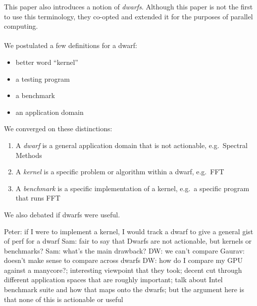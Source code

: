 This paper also introduces a notion of \textit{dwarfs}.
Although this paper is not the first to use this terminology, they co-opted and extended it for the purposes of parallel computing.
\\ \\
We postulated a few definitions for a dwarf:
\begin{itemize}
    \item better word ``kernel''
    \item a testing program
    \item a benchmark
    \item an application domain
\end{itemize}

We converged on these distinctions:
\begin{enumerate}
    \item A \textit{dwarf} is a general application domain that is not actionable, e.g.\ Spectral Methods
    \item A \textit{kernel} is a specific problem or algorithm within a dwarf, e.g.\ FFT
    \item A \textit{benchmark} is a specific implementation of a kernel, e.g.\ a specific program that runs FFT
\end{enumerate}

We also debated if dwarfs were useful.

Peter: if I were to implement a kernel, I would track a dwarf to give a general gist of perf for a dwarf
Sam: fair to say that Dwarfs are not actionable, but kernels or benchmarks?
Sam: what's the main drawback?
DW: we can't compare
Gaurav: doesn't make sense to compare across dwarfs
DW: how do I compare my GPU against a manycore?; interesting viewpoint that they took; decent cut through different application spaces that are roughly important; talk about Intel benchmark suite and how that maps onto the dwarfs; but the argument here is that none of this is actionable or useful

